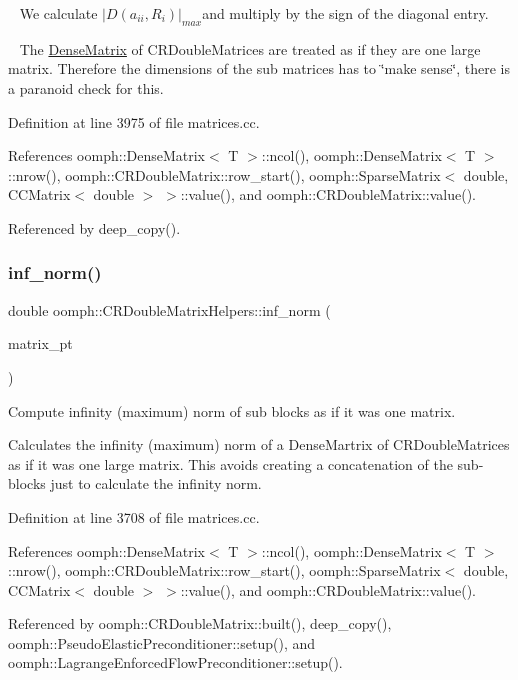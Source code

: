 ~\newline
 We calculate $ |D(a_{ii},R_i)|_{max} $and multiply by the sign of the diagonal entry.

~\newline
 The \hyperlink{classoomph_1_1DenseMatrix}{Dense\+Matrix} of C\+R\+Double\+Matrices are treated as if they are one large matrix. Therefore the dimensions of the sub matrices has to \char`\"{}make sense\char`\"{}, there is a paranoid check for this. 

Definition at line 3975 of file matrices.\+cc.



References oomph\+::\+Dense\+Matrix$<$ T $>$\+::ncol(), oomph\+::\+Dense\+Matrix$<$ T $>$\+::nrow(), oomph\+::\+C\+R\+Double\+Matrix\+::row\+\_\+start(), oomph\+::\+Sparse\+Matrix$<$ double, C\+C\+Matrix$<$ double $>$ $>$\+::value(), and oomph\+::\+C\+R\+Double\+Matrix\+::value().



Referenced by deep\+\_\+copy().

\mbox{\label{namespaceoomph_1_1CRDoubleMatrixHelpers_ad81583a57fba80fee50d14afdf1c86e2}} 
\subsubsection{\texorpdfstring{inf\+\_\+norm()}{inf\_norm()}}
{\footnotesize\ttfamily double oomph\+::\+C\+R\+Double\+Matrix\+Helpers\+::inf\+\_\+norm (\begin{DoxyParamCaption}\item[{const \hyperlink{classoomph_1_1DenseMatrix}{Dense\+Matrix}$<$ \hyperlink{classoomph_1_1CRDoubleMatrix}{C\+R\+Double\+Matrix} $\ast$$>$ \&}]{matrix\+\_\+pt }\end{DoxyParamCaption})}



Compute infinity (maximum) norm of sub blocks as if it was one matrix. 

Calculates the infinity (maximum) norm of a Dense\+Martrix of C\+R\+Double\+Matrices as if it was one large matrix. This avoids creating a concatenation of the sub-\/blocks just to calculate the infinity norm. 

Definition at line 3708 of file matrices.\+cc.



References oomph\+::\+Dense\+Matrix$<$ T $>$\+::ncol(), oomph\+::\+Dense\+Matrix$<$ T $>$\+::nrow(), oomph\+::\+C\+R\+Double\+Matrix\+::row\+\_\+start(), oomph\+::\+Sparse\+Matrix$<$ double, C\+C\+Matrix$<$ double $>$ $>$\+::value(), and oomph\+::\+C\+R\+Double\+Matrix\+::value().



Referenced by oomph\+::\+C\+R\+Double\+Matrix\+::built(), deep\+\_\+copy(), oomph\+::\+Pseudo\+Elastic\+Preconditioner\+::setup(), and oomph\+::\+Lagrange\+Enforced\+Flow\+Preconditioner\+::setup().

